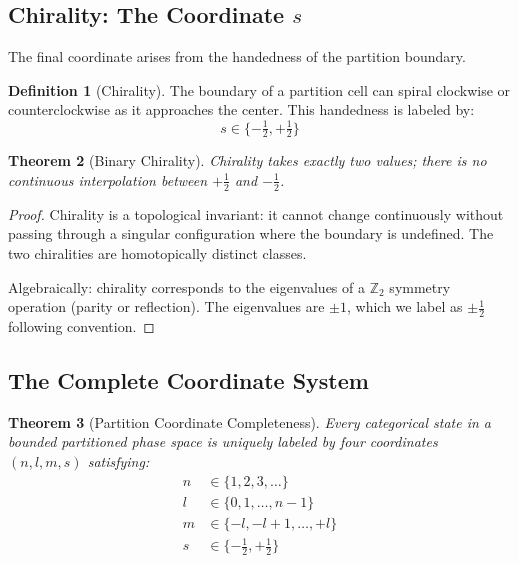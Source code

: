 \documentclass[twocolumn,10pt,a4paper]{article}
\newtheorem{theorem}{Theorem}[section]
\theoremstyle{definition}
\newtheorem{definition}[theorem]{Definition}
\theoremstyle{remark}
\begin{document}
\subsection{Chirality: The Coordinate $s$}

The final coordinate arises from the handedness of the partition boundary.

\begin{definition}[Chirality]
The boundary of a partition cell can spiral clockwise or counterclockwise as it approaches the center. This handedness is labeled by:
\begin{equation}
    s \in \{-\tfrac{1}{2}, +\tfrac{1}{2}\}
\end{equation}
\end{definition}

\begin{theorem}[Binary Chirality]
\label{thm:binary_chirality}
Chirality takes exactly two values; there is no continuous interpolation between $+\frac{1}{2}$ and $-\frac{1}{2}$.
\end{theorem}

\begin{proof}
Chirality is a topological invariant: it cannot change continuously without passing through a singular configuration where the boundary is undefined. The two chiralities are homotopically distinct classes.

Algebraically: chirality corresponds to the eigenvalues of a $\mathbb{Z}_2$ symmetry operation (parity or reflection). The eigenvalues are $\pm 1$, which we label as $\pm\frac{1}{2}$ following convention.
\end{proof}

\subsection{The Complete Coordinate System}

\begin{theorem}[Partition Coordinate Completeness]
\label{thm:completeness}
Every categorical state in a bounded partitioned phase space is uniquely labeled by four coordinates $(n, l, m, s)$ satisfying:
\begin{align}
    n &\in \{1, 2, 3, \ldots\} \\
    l &\in \{0, 1, \ldots, n-1\} \\
    m &\in \{-l, -l+1, \ldots, +l\} \\
    s &\in \{-\tfrac{1}{2}, +\tfrac{1}{2}\}
\end{align}
\end{theorem}
\end{document}
